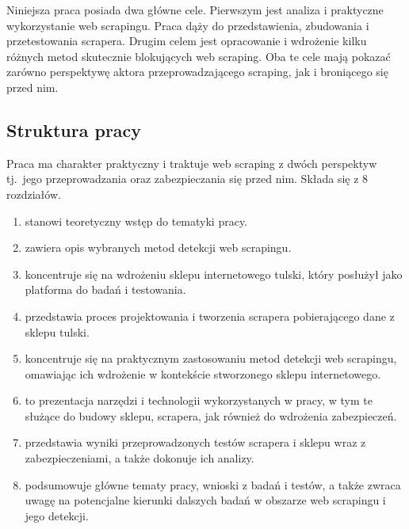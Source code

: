 Niniejsza praca posiada dwa główne cele.
Pierwszym jest analiza i praktyczne wykorzystanie web scrapingu.
Praca dąży do przedstawienia, zbudowania i przetestowania scrapera.
Drugim celem jest opracowanie i wdrożenie kilku różnych metod skutecznie blokujących web scraping.
Oba te cele mają pokazać zarówno perspektywę aktora przeprowadzającego scraping, jak i broniącego się przed nim.

\clearpage

\subsection{Struktura pracy}\label{subsec:struktura-pracy}

Praca ma charakter praktyczny i traktuje web scraping z dwóch perspektyw tj.~jego przeprowadzania oraz zabezpieczania się przed nim.
Składa się z 8 rozdziałów.
\begin{enumerate}[label={\textbf{Rozdział \arabic*}},labelindent=\parindent, leftmargin=*]
    \item {} stanowi teoretyczny wstęp do tematyki pracy.
    \item {} zawiera opis wybranych metod detekcji web scrapingu.
    \item {} koncentruje się na wdrożeniu sklepu internetowego tulski, który posłużył jako platforma do badań i testowania.
    \item {} przedstawia proces projektowania i tworzenia scrapera pobierającego dane z sklepu tulski.
    \item {} koncentruje się na praktycznym zastosowaniu metod detekcji web scrapingu, omawiając ich wdrożenie w kontekście stworzonego sklepu internetowego.
    \item {} to prezentacja narzędzi i technologii wykorzystanych w pracy, w tym te służące do budowy sklepu, scrapera, jak również do wdrożenia zabezpieczeń.
    \item {} przedstawia wyniki przeprowadzonych testów scrapera i sklepu wraz z zabezpieczeniami, a także dokonuje ich analizy.
    \item {} podsumowuje główne tematy pracy, wnioski z badań i testów, a także zwraca uwagę na potencjalne kierunki dalszych badań w obszarze web scrapingu i jego detekcji.
\end{enumerate}
